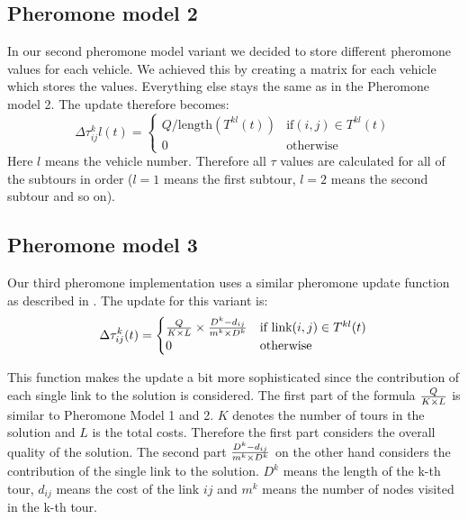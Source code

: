 \documentclass[a4paper]{scrartcl}
\begin{document}
\subsection{Pheromone model 2}

In our second pheromone model variant we decided to store different pheromone values for each vehicle. We achieved this by creating a matrix for each vehicle which stores the values. Everything else stays the same as in the Pheromone model 2.
The update therefore becomes:
\begin{equation}
  \Delta \tau_{ij}^kl(t) = \begin{cases}
    Q / \text{length}(T^{kl}(t)) & \text{if}(i,j) \in T^{kl}(t) \\
    0 & \text{otherwise}
  \end{cases} 
\end{equation}
Here $l$ means the vehicle number. Therefore all $\tau$ values are calculated for all of the subtours in order ($l=1$ means the first subtour, $l=2$ means the second subtour and so on).


\subsection{Pheromone model 3}

Our third pheromone implementation uses a similar pheromone update function as described in \cite{Yu2009171}.
The update for this variant is:
\begin{equation}
  \Delta \tau_{ij}^k(t) = \begin{cases}
    {Q \over {K \times L}} \times {{D^k - d_{ij}} \over {m^k \times D^k}} & \text{if link} (i,j)  \in T^{kl}(t) \\
    0 & \text{otherwise}
  \end{cases} 
\end{equation}

This function makes the update a bit more sophisticated since the contribution of each single link to the solution is considered. The first part of the formula ${Q \over {K \times L}}$ is similar to Pheromone Model 1 and 2. $K$ denotes the number of tours in the solution and $L$ is the total costs. Therefore the first part considers the overall quality of the solution. The second part ${{D^k - d_{ij}} \over {m^k \times D^k}}$ on the other hand considers the contribution of the single link to the solution. $D^k$ means the length of the k-th tour, $d_{ij}$ means the cost of the link $ij$ and $m^k$ means the number of nodes visited in the k-th tour.
\end{document}
